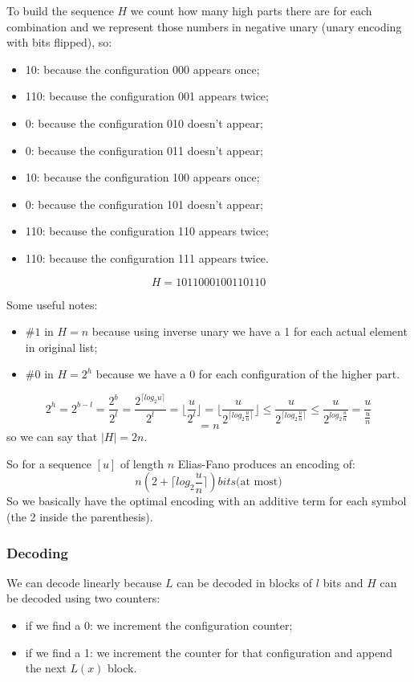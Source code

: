 To build the sequence $H$ we count how many high parts there are for each combination and we represent those numbers in negative unary (unary encoding with bits flipped), so:
\begin{itemize}
    \item 10: because the configuration 000 appears once;
    \item 110: because the configuration 001 appears twice;
    \item 0: because the configuration 010 doesn't appear;
    \item 0: because the configuration 011 doesn't appear;
    \item 10: because the configuration 100 appears once;
    \item 0: because the configuration 101 doesn't appear;
    \item 110: because the configuration 110 appears twice;
    \item 110: because the configuration 111 appears twice.
\end{itemize}
$$
    H = 1011000100110110
$$

Some useful notes:
\begin{itemize}
    \item $\#1$ in $H = n$ because using inverse unary we have a 1 for each actual element in original list;
    \item $\#0$ in $H = 2^h$ because we have a 0 for each configuration of the higher part.
\end{itemize}
$$
    2^h = 2^{b-l} = \frac{2^b}{2^l} = \frac{2^{\lceil log_2 u \rceil}}{2^l} = \lfloor \frac{u}{2^l} \rfloor = \lfloor \frac{u}{2^{\lceil log_2 \frac{u}{n} \rceil}} \rfloor \leq \frac{u}{2^{\lceil log_2 \frac{u}{n} \rceil}} \leq \frac{u}{2^{log_2 \frac{u}{n}}} = \frac{u}{\frac{u}{n}}
$$
$$
    = n
$$
so we can say that $|H| = 2n$.

So for a sequence $[u]$ of length $n$ Elias-Fano produces an encoding of:
$$
    n \left( 2 + \lceil log_2 \frac{u}{n} \rceil \right) bits \text{(at most)}
$$
So we basically have the optimal encoding with an additive term for each symbol (the 2 inside the parenthesis).

\subsubsection{Decoding}
We can decode linearly because $L$ can be decoded in blocks of $l$ bits and $H$ can be decoded using two counters:
\begin{itemize}
    \item if we find a 0: we increment the configuration counter;
    \item if we find a 1: we increment the counter for that configuration and append the next $L(x)$ block.
\end{itemize}

